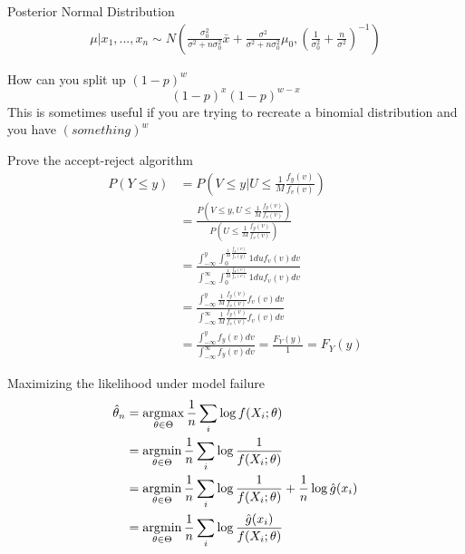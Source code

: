 \documentclass[avery5388,grid,frame]{flashcards}
\begin{document}
\begin{flashcard}{Posterior Normal Distribution}
\bigskip\bigskip\bigskip
\begin{align*}
\mu|x_1,...,x_n\sim N\left(\frac{\sigma_0^2}{\sigma^2+n\sigma^2_0}\bar{x}+\frac{\sigma^2}{\sigma^2+n\sigma^2_0}\mu_0,\left(\frac{1}{\sigma^2_0}+\frac{n}{\sigma^2}\right)^{-1}\right)
\end{align*}
\end{flashcard}
\begin{flashcard}{How can you split up $(1-p)^w$}
\bigskip\bigskip\bigskip
\begin{equation*}
(1-p)^x(1-p)^{w-x}
\end{equation*}
This is sometimes useful if you are trying to recreate a binomial distribution and you have $(something)^w$
\end{flashcard}
\begin{flashcard}[Proof]{Prove the accept-reject algorithm}
\small{
{\begin{align*}
P(Y\leq y)&=P\left(V\leq y|U\leq\frac{1}{M}\frac{f_y(v)}{f_v(v)}\right)\\
&=\frac{P\left(V\leq y,U\leq\frac{1}{M}\frac{f_y(v)}{f_v(v)}\right)}{P\left(U\leq\frac{1}{M}\frac{f_y(v)}{f_v(v)}\right)}\\
&=\frac{\int_{-\infty}^y\int_0^{\frac{1}{M}\frac{f_y(v)}{f_v(y)}}1duf_v(v)dv}{\int_{-\infty}^\infty \int_{0}^{\frac{1}{M}\frac{f_y(v)}{f_v(v)}}1duf_v(v)dv}\\
&=\frac{\int_{-\infty}^y\frac{1}{M}\frac{f_y(v)}{f_v(v)}f_v(v)dv}{\int_{-\infty}^\infty\frac{1}{M}\frac{f_y(v)}{f_v(v)}f_v(v)dv}\\
&=\frac{\int_{-\infty}^yf_y(v)dv}{\int_{-\infty}^\infty f_y(v)dv}=\frac{F_Y(y)}{1}=F_Y(y)
\end{align*}}}
\end{flashcard}
\begin{flashcard}[Proof]{Maximizing the likelihood under model failure}
\bigskip\bigskip
{\begin{align*}
\hat{\theta}_n&=\operatorname*{\arg\!\max}_{\theta\in\Theta}\frac{1}{n}\sum_i\log f(X_i;\theta)\\
&=\operatorname*{\arg\!\min}_{\theta\in\Theta}\frac{1}{n}\sum_i\log\frac{1}{f(X_i;\theta)}\\
&=\operatorname*{\arg\!\min}_{\theta\in\Theta}\frac{1}{n}\sum_i\log\frac{1}{f(X_i;\theta)}+\frac{1}{n}\log\hat{g}(x_i)\\
&=\operatorname*{\arg\!\min}_{\theta\in\Theta}\frac{1}{n}\sum_i\log\frac{\hat{g}(x_i)}{f(X_i;\theta)}
\end{align*}}
\end{flashcard}
\end{document}
